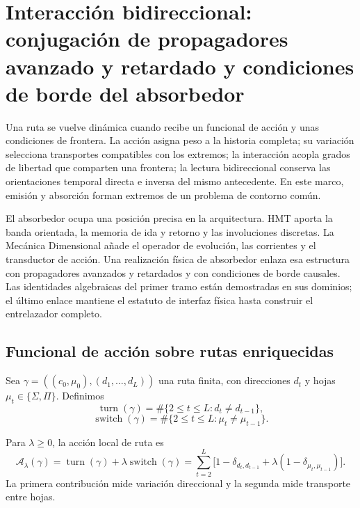\chapter{Interacción bidireccional: conjugación de propagadores avanzado y retardado y condiciones de borde del absorbedor}
\label{chap:mt-accion-interaccion-absorbedor}

Una ruta se vuelve dinámica cuando recibe un funcional de acción y unas
condiciones de frontera. La acción asigna peso a la historia completa; su
variación selecciona transportes compatibles con los extremos; la
interacción acopla grados de libertad que comparten una frontera; la lectura
bidireccional conserva las orientaciones temporal directa e inversa del
mismo antecedente. En este marco, emisión y absorción forman extremos de un
problema de contorno común.

El absorbedor ocupa una posición precisa en la arquitectura. HMT aporta la
banda orientada, la memoria de ida y retorno y las involuciones discretas.
La Mecánica Dimensional añade el operador de evolución, las corrientes y el
transductor de acción. Una realización física de absorbedor enlaza esa
estructura con propagadores avanzados y retardados y con condiciones de
borde causales. Las identidades algebraicas del primer tramo están
demostradas en sus dominios; el último enlace mantiene el estatuto de
interfaz física hasta construir el entrelazador completo.

\section{Funcional de acción sobre rutas enriquecidas}

Sea $\gamma=((c_0,\mu_0),(d_1,\ldots,d_L))$ una ruta finita, con direcciones
$d_t$ y hojas $\mu_t\in\{\Sigma,\Pi\}$. Definimos
\[
 \operatorname{turn}(\gamma)
 =\#\{2\leq t\leq L:d_t\neq d_{t-1}\},
\]
\[
 \operatorname{switch}(\gamma)
 =\#\{2\leq t\leq L:\mu_t\neq\mu_{t-1}\}.
\]

\begin{definicionnarrativa}[title={Acción discreta de interacción mínima}]
\label{def:mt-accion-minima}
Para $\lambda\geq0$, la acción local de ruta es
\begin{equation}
 \mathcal A_\lambda(\gamma)
 =\operatorname{turn}(\gamma)
 +\lambda\operatorname{switch}(\gamma)
 =\sum_{t=2}^{L}
 \bigl[1-\delta_{d_t,d_{t-1}}
 +\lambda(1-\delta_{\mu_t,\mu_{t-1}})\bigr].
 \label{eq:mt-accion-minima}
\end{equation}
La primera contribución mide variación direccional y la segunda mide
transporte entre hojas.
\end{definicionnarrativa}

